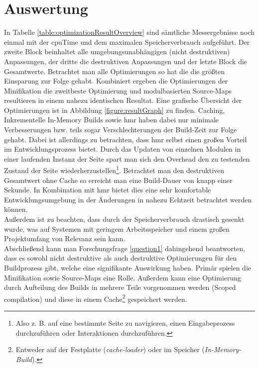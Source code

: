 \documentclass[11pt]{report}
\begin{document}
	\chapter{Auswertung}
		In Tabelle \ref{table:optimizationResultOverview} sind sämtliche Messergebnisse noch einmal mit der \Gls{cpuTime} und dem maximalen Speicherverbrauch aufgeführt. Der zweite Block beinhaltet alle umgebungsunabhängigen (nicht destruktiven) Anpassungen, der dritte die destruktiven Anpassungen und der letzte Block die Gesamtwerte. Betrachtet man alle Optimierungen so hat die  die größten Einsparung zur Folge gehabt. Kombiniert ergeben die Optimierungen der Minifikation die zweitbeste Optimierung und modulbasierten Source-Maps resultieren in einem nahezu identischen Resultat. Eine grafische Übersicht der Optimierungen ist in Abbildung \ref{figure:resultGraph} zu finden. Caching, Inkrementelle In-Memory Builds sowie \Gls{hmr} haben dabei nur minimale Verbesserungen bzw. teils sogar Verschlechterungen der Build-Zeit zur Folge gehabt. Dabei ist allerdings zu betrachten, dass \Gls{hmr} selbst einen großen Vorteil im Entwicklungsprozess bietet. Durch das Updaten von einzelnen Modulen in einer laufenden Instanz der Seite spart man sich den Overhead den zu testenden Zustand der Seite wiederherzustellen\footnote{Also z. B. auf eine bestimmte Seite zu navigieren, einen Eingabeprozess durchzuführen oder Interaktionen durchzuführen.}. Betrachtet man den destruktiven Gesamtwert ohne Cache so erreicht man eine Build-Dauer von knapp einer Sekunde. In Kombination mit \Gls{hmr} bietet dies eine sehr komfortable Entwicklungsumgebung in der Änderungen in nahezu Echtzeit betrachtet werden können.\\
		Außerdem ist zu beachten, dass durch  der Speicherverbrauch drastisch gesenkt wurde, was auf Systemen mit geringem Arbeitsspeicher und einem großen Projektumfang von Relevanz sein kann.\\
		Abschließend kann man Forschungsfrage \ref{question1} dahingehend beantworten, dass es sowohl nicht destruktive als auch destruktive Optimierungen für den Buildprozess gibt, welche eine signifikante Auswirkung haben. Primär spielen die Minifikation sowie Source-Maps eine Rolle. Außerdem kann eine Optimierung durch Aufteilung des Builds in mehrere Teile vorgenommen werden (Scoped compilation) und diese in einem Cache\footnote{Entweder auf der Festplatte (\emph{cache-loader}) oder im Speicher (\emph{In-Memory-Build}).} gespeichert werden.
		
\end{document}
